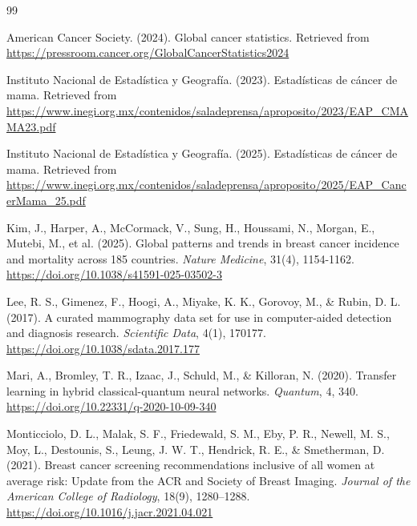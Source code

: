 \begin{thebibliography}{99}

    American Cancer Society. (2024). Global cancer statistics. Retrieved from
    \url{https://pressroom.cancer.org/GlobalCancerStatistics2024}


    Instituto Nacional de Estadística y Geografía. (2023). Estadísticas de cáncer de mama.
    Retrieved from \url{https://www.inegi.org.mx/contenidos/saladeprensa/aproposito/2023/EAP_CMAMA23.pdf}


    Instituto Nacional de Estadística y Geografía. (2025). Estadísticas de cáncer de mama.
    Retrieved from \url{https://www.inegi.org.mx/contenidos/saladeprensa/aproposito/2025/EAP_CancerMama_25.pdf}


    Kim, J., Harper, A., McCormack, V., Sung, H., Houssami, N., Morgan, E., Mutebi, M.,
    et al. (2025). Global patterns and trends in breast cancer incidence and mortality
    across 185 countries. \textit{Nature Medicine}, 31(4), 1154-1162.
    \url{https://doi.org/10.1038/s41591-025-03502-3}


    Lee, R. S., Gimenez, F., Hoogi, A., Miyake, K. K., Gorovoy, M., \& Rubin, D. L. (2017).
    A curated mammography data set for use in computer-aided detection and diagnosis research.
    \textit{Scientific Data}, 4(1), 170177.
    \url{https://doi.org/10.1038/sdata.2017.177}

    Mari, A., Bromley, T. R., Izaac, J., Schuld, M., \& Killoran, N. (2020).
    Transfer learning in hybrid classical-quantum neural networks.
    \textit{Quantum}, 4, 340.
    \url{https://doi.org/10.22331/q-2020-10-09-340}

    Monticciolo, D. L., Malak, S. F., Friedewald, S. M., Eby, P. R., Newell, M. S., Moy, L.,
    Destounis, S., Leung, J. W. T., Hendrick, R. E., \& Smetherman, D. (2021).
    Breast cancer screening recommendations inclusive of all women at average risk: Update from the ACR and Society of Breast Imaging.
    \textit{Journal of the American College of Radiology}, 18(9), 1280--1288.
    \url{https://doi.org/10.1016/j.jacr.2021.04.021}


\end{thebibliography}
